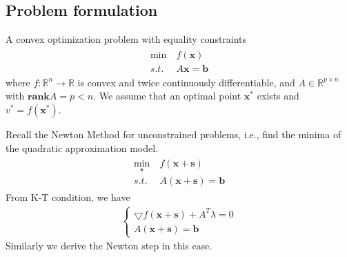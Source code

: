 \subsection{Problem formulation}
A convex optimization problem with equality constraints
\begin{align}
    \begin{array}{ll}
        \min \ &f(\mathbf{x}) \\
        s.t. \ &A\mathbf{x} = \mathbf{b}
    \end{array}
    \label{pro:conv-equ-constraint}
\end{align}
where $f:\mathbb{R}^n \rightarrow \mathbb{R}$ is convex
and twice continuously differentiable, and
$A \in \mathbb{R}^{p \times n}$ with
$\mathbf{rank}A = p < n$. We assume that an
optimal point $\mathbf{x}^*$ exists and $v^* = f(\mathbf{x}^*)$.
\par
Recall the Newton Method for unconstrained problems, i.e.,
find the minima of the quadratic approximation model.
\begin{align}
    \begin{array}{ll}
        \min_{\mathbf{s}} \ &f(\mathbf{x} + \mathbf{s}) \\
        s.t. \ &A(\mathbf{x} + \mathbf{s}) = \mathbf{b}
    \end{array}
    \label{pro:newton-equ-constraint}
\end{align}
From K-T condition, we have
\begin{align}
    \left\{
        \begin{array}{ll}
            \bigtriangledown f(\mathbf{x} + \mathbf{s}) + A^T \lambda = 0 \\
             A(\mathbf{x} + \mathbf{s}) = \mathbf{b}
        \end{array}\right.
        \label{equ:newton-kt1}
\end{align}
Similarly we derive the Newton step in this case.


